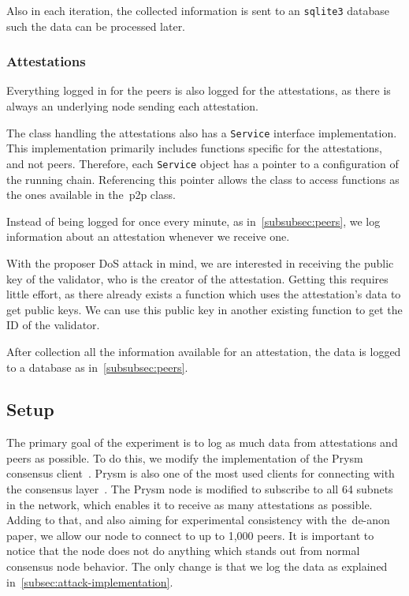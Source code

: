 Also in each iteration,
the collected information is sent to an \texttt{sqlite3} database such the data can be processed later.

\subsubsection{Attestations}\label{subsubsec:attestations}
Everything logged in for the peers is also logged for the attestations,
as there is always an underlying node sending each attestation.

The class handling the attestations also has a \texttt{Service} interface implementation.
This implementation primarily includes functions specific for the attestations, and not peers.
Therefore, each \texttt{Service} object has a pointer to a configuration of the running chain.
Referencing this pointer allows the class to access functions as the ones available in the~\gls{p2p} class.

Instead of being logged for once every minute, as in~\autoref{subsubsec:peers},
we log information about an attestation whenever we receive one.

With the proposer DoS attack in mind, we are interested in receiving the public key of the validator,
who is the creator of the attestation.
Getting this requires little effort,
as there already exists a function which uses the attestation's data to get public keys.
We can use this public key in another existing function to get the ID of the validator.

After collection all the information available for an attestation,
the data is logged to a database as in~\autoref{subsubsec:peers}.

\subsection{Setup}\label{subsec:setup}
The primary goal of the experiment is to log as much data from attestations and peers as possible.
To do this, we modify the implementation of the Prysm consensus client~\cite{prysm}.
Prysm is also one of the most used clients for connecting with the consensus layer~\cite{client-diversity}.
The Prysm node is modified to subscribe to all 64 subnets in the network, which enables it to receive as many attestations as possible.
Adding to that, and also aiming for experimental consistency with the~\gls{de-anon paper}, we allow our node to connect to up to 1,000 peers.
It is important to notice that the node does not do anything which stands out from normal consensus node behavior.
The only change is that we log the data as explained in~\autoref{subsec:attack-implementation}.

